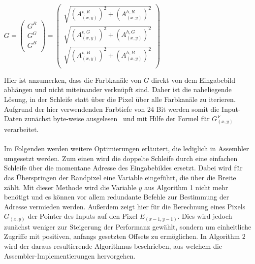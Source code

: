\documentclass[course=asp]{aspdoc}
\begin{document}
\begin{center}
$G=\left(
\begin{array}{c}
G^R\\
G^G\\
G^B\\
\end{array}
\right)=\left(
\begin{array}{c}
\sqrt{(A_{(x,y)}^{v, R})^{2}+(A_{(x,y)}^{h, R})^{2}}\\
\sqrt{(A_{(x,y)}^{v, G})^{2}+(A_{(x,y)}^{h, G})^{2}}\\
\sqrt{(A_{(x,y)}^{v, B})^{2}+(A_{(x,y)}^{h, B})^{2}}\\
\end{array}
\right)$
\end{center}
Hier ist anzumerken, dass die Farbkanäle von $G$ direkt von dem Eingabebild abhängen und nicht miteinander verknüpft sind. Daher ist die naheliegende Lösung, in der Schleife statt über die Pixel über alle Farbkanäle zu iterieren. Aufgrund der hier verwendenden Farbtiefe von 24 Bit werden somit die Input-Daten zunächst byte-weise ausgelesen~\cite{bitmapwiki} und mit Hilfe der Formel für $G_{(x,y)}^F$ verarbeitet.\\\\
Im Folgenden werden weitere Optimierungen erläutert, die lediglich in Assembler umgesetzt werden. Zum einen wird die doppelte Schleife durch eine einfachen Schleife über die momentane Adresse des Eingabebildes ersetzt. Dabei wird für das Überspringen der Randpixel eine Variable eingeführt, die über die Breite zählt. Mit dieser Methode wird die Variable $y$ aus Algorithm 1 nicht mehr benötigt und es können vor allem redundante Befehle zur Bestimmung der Adresse vermieden werden. Außerdem zeigt hier für die Berechnung eines Pixels $G_{(x,y)}$ der Pointer des Inputs auf den Pixel $E_{(x-1,y-1)}$. Dies wird jedoch zunächst weniger zur Steigerung der Performanz gewählt, sondern um einheitliche Zugriffe mit positiven, anfangs gesetzten Offsets zu ermöglichen. In Algorithm 2 wird der daraus resultierende Algorithmus beschrieben, aus welchem die Assembler-Implementierungen hervorgehen.\\\\
\end{document}
